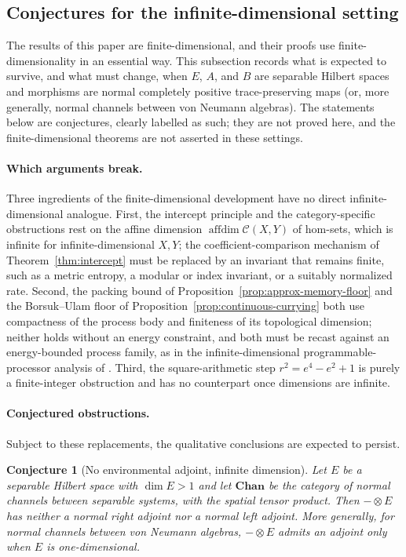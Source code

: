 \documentclass[11pt]{article}
\newtheorem{conjecture}[theorem]{Conjecture}
\DeclareMathOperator{\affdim}{affdim}
\begin{document}
\subsection{Conjectures for the infinite-dimensional setting}
\label{subsec:infinite-dim}

The results of this paper are finite-dimensional, and their proofs use
finite-dimensionality in an essential way. This subsection records what is
expected to survive, and what must change, when $E$, $A$, and $B$ are
separable Hilbert spaces and morphisms are normal completely positive
trace-preserving maps (or, more generally, normal channels between von Neumann
algebras). The statements below are conjectures, clearly labelled as such; they
are not proved here, and the finite-dimensional theorems are not asserted in
these settings.

\paragraph{Which arguments break.}
Three ingredients of the finite-dimensional development have no direct
infinite-dimensional analogue. First, the intercept principle and the
category-specific obstructions rest on the affine dimension
$\affdim\mathcal C(X,Y)$ of hom-sets, which is infinite for infinite-dimensional
$X,Y$; the coefficient-comparison mechanism of Theorem~\ref{thm:intercept} must
be replaced by an invariant that remains finite, such as a metric entropy,
a modular or index invariant, or a suitably normalized rate. Second, the
packing bound of Proposition~\ref{prop:approx-memory-floor} and the
Borsuk--Ulam floor of Proposition~\ref{prop:continuous-currying} both use
compactness of the process body and finiteness of its topological dimension;
neither holds without an energy constraint, and both must be recast against an
energy-bounded process family, as in the infinite-dimensional programmable-processor
analysis of \cite{GschwendtnerWinter2021}. Third, the square-arithmetic step
$r^2=e^4-e^2+1$ is purely a finite-integer obstruction and has no counterpart
once dimensions are infinite.

\paragraph{Conjectured obstructions.}
Subject to these replacements, the qualitative conclusions are expected to
persist.

\begin{conjecture}[No environmental adjoint, infinite dimension]
\label{conj:infinite-adjoint}
Let $E$ be a separable Hilbert space with $\dim E>1$ and let $\mathbf{Chan}$ be
the category of normal channels between separable systems, with the spatial
tensor product. Then $-\otimes E$ has neither a normal right adjoint nor a
normal left adjoint. More generally, for normal channels between von Neumann
algebras, $-\otimes E$ admits an adjoint only when $E$ is one-dimensional.
\end{conjecture}
\end{document}
